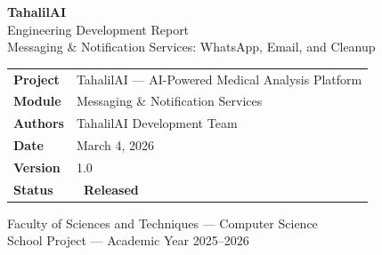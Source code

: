 \documentclass[12pt, a4paper]{article}
\newcommand{\badge}[2]{\colorbox{#1}{\color{white}\small\textbf{\ #2\ }}}
\begin{document}

\begin{titlepage}

  \vspace*{1.5cm}
  \begin{center}
    {\color{white}\fontsize{28}{34}\selectfont\bfseries TahalilAI}\\[0.4cm]
    {\color{white!80!gray}\fontsize{14}{18}\selectfont Engineering Development Report}\\[0.2cm]
    {\color{accent!60!white}\fontsize{11}{14}\selectfont
      Messaging \& Notification Services: WhatsApp, Email, and Cleanup}
  \end{center}

  \vspace{4.5cm}

  \begin{center}
    \begin{tcolorbox}[
      enhanced, width=0.85\textwidth,
      colback=lightgray, colframe=primary,
      arc=4pt, boxrule=1pt,
      left=14pt, right=14pt, top=10pt, bottom=10pt
    ]
      \begin{tabular}{@{}ll}
        \textbf{Project}   & TahalilAI — AI-Powered Medical Analysis Platform \\[4pt]
        \textbf{Module}    & Messaging \& Notification Services \\[4pt]
        \textbf{Authors}   & TahalilAI Development Team \\[4pt]
        \textbf{Date}      & March 4, 2026 \\[4pt]
        \textbf{Version}   & 1.0 \\[4pt]
        \textbf{Status}    & \badge{success}{Released} \\
      \end{tabular}
    \end{tcolorbox}
  \end{center}

  \vfill

  \begin{center}
    \color{midgray}\small
    Faculty of Sciences and Techniques — Computer Science\\
    School Project — Academic Year 2025--2026
  \end{center}
\end{titlepage}
\end{document}
